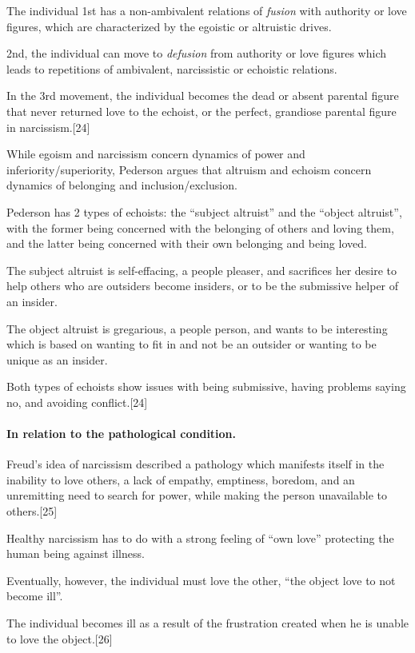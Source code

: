 \documentclass[oneside]{book}
\numberwithin{equation}{section}
\begin{document}
The individual 1st has a non-ambivalent relations of \textit{fusion} with authority or love figures, which are characterized by the egoistic or altruistic drives.

2nd, the individual can move to \textit{defusion} from authority or love figures which leads to repetitions of ambivalent, narcissistic or echoistic relations.

In the 3rd movement, the individual becomes the dead or absent parental figure that never returned love to the echoist, or the perfect, grandiose parental figure in narcissism.[24]

While egoism and narcissism concern dynamics of power and inferiority/superiority, Pederson argues that altruism and echoism concern dynamics of belonging and inclusion/exclusion.

Pederson has 2 types of echoists: the ``subject altruist'' and the ``object altruist'', with the former being concerned with the belonging of others and loving them, and the latter being concerned with their own belonging and being loved.

The subject altruist is self-effacing, a people pleaser, and sacrifices her desire to help others who are outsiders become insiders, or to be the submissive helper of an insider.

The object altruist is gregarious, a people person, and wants to be interesting which is based on wanting to fit in and not be an outsider or wanting to be unique as an insider.

Both types of echoists show issues with being submissive, having problems saying no, and avoiding conflict.[24]

\paragraph{In relation to the pathological condition.} Freud's idea of narcissism described a pathology which manifests itself in the inability to love others, a lack of empathy, emptiness, boredom, and an unremitting need to search for power, while making the person unavailable to others.[25]

%
Healthy narcissism has to do with a strong feeling of ``own love'' protecting the human being against illness.

Eventually, however, the individual must love the other, ``the object love to not become ill''.

The individual becomes ill as a result of the frustration created when he is unable to love the object.[26]
\end{document}
